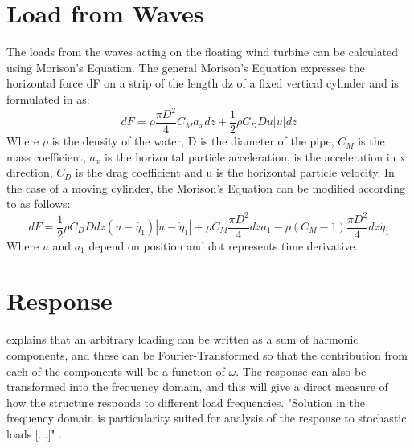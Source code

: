 \section{Load from Waves}
The loads from the waves acting on the floating wind turbine can be calculated using Morison's Equation. The general Morison's Equation expresses the horizontal force dF on a strip of the length dz of a fixed vertical cylinder and is formulated in \cite{BP2007} as:
\begin{equation}
    dF=\rho \frac{\pi D^2}{4} C_M a_x dz +\frac{1}{2} \rho C_D Du |u|dz
    \label{eq:morison}
\end{equation}
\noindent Where $\rho$ is the density of the water, D is the diameter of the pipe, $C_M$ is the mass coefficient, $a_x$ is the horizontal particle acceleration, is the acceleration in x direction, $C_D$ is the drag coefficient and u is the horizontal particle velocity. \newline
\newline
\newline
In the case of a moving cylinder, the Morison's Equation can be modified according to \cite{Faltinsen1990} as follows:
\begin{equation}
    dF=\frac{1}{2}\rho C_D D dz(u-\dot{\eta_1}) |u-\dot \eta_1| +  \rho C_M \frac{\pi D^2}{4} dz a_1 -\rho (C_M-1) \frac{\pi D^2}{4} dz \ddot{\eta_1}
    \label{eq:movemorison}
\end{equation}
Where $u$ and $a_1$ depend on position and dot represents time derivative.
\section{Response}
\cite{Langen1999} explains that an arbitrary loading can be written as a sum of harmonic components, and these can be Fourier-Transformed so that the contribution from each of the components will be a function of $\omega$. The response can also be transformed into the frequency domain, and this will give a direct measure of how the structure responds to different load frequencies. "Solution in the frequency domain is particularity suited for analysis of the response to stochastic loads [...]" \cite{Langen1999}. 
 
